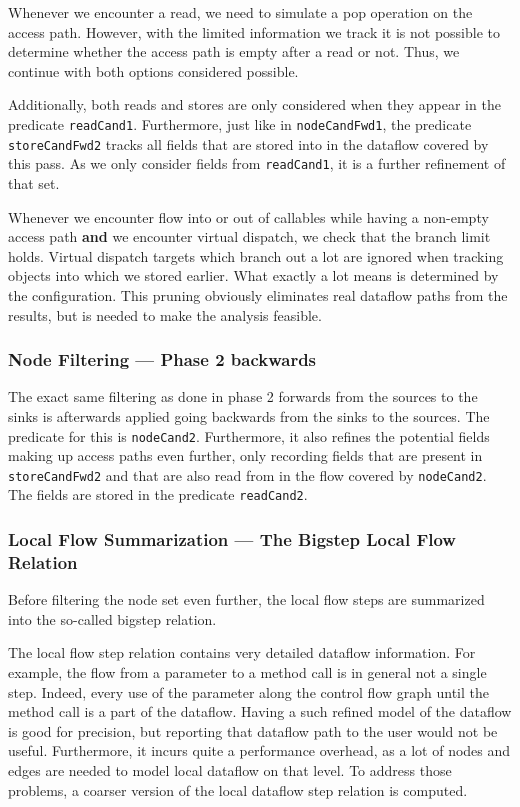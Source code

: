 Whenever we encounter a read, we need to simulate a pop operation on the access path.
However, with the limited information we track it is not possible to determine 
whether the access path is empty after a read or not.
Thus, we continue with both options considered possible.

Additionally, both reads and stores are only considered when they appear in the 
predicate \texttt{readCand1}.
Furthermore, just like in \texttt{nodeCandFwd1}, the predicate 
\texttt{storeCandFwd2} tracks all fields that are stored into in the dataflow
covered by this pass.
As we only consider fields from \texttt{readCand1}, it is a further refinement 
of that set.

Whenever we encounter flow into or out of callables while having a non-empty 
access path \textbf{and} we encounter virtual dispatch,
we check that the branch limit holds.
Virtual dispatch targets which branch out a lot are ignored when tracking objects 
into which we stored earlier. What exactly a lot means is determined by the 
configuration.
This pruning obviously eliminates real dataflow paths from the results, but is needed
to make the analysis feasible.

\subsubsection*{Node Filtering --- Phase 2 backwards}
The exact same filtering as done in phase 2 forwards from the sources to the sinks 
is afterwards applied going backwards from the sinks to the sources.
The predicate for this is \texttt{nodeCand2}.
Furthermore, it also refines the potential fields making up access paths even further,
only recording fields that are present in \texttt{storeCandFwd2} and that are 
also read from in the flow covered by \texttt{nodeCand2}.
The fields are stored in the predicate \texttt{readCand2}.


\subsubsection*{Local Flow Summarization --- The Bigstep Local Flow Relation}
Before filtering the node set even further, the local flow steps are summarized 
into the so-called bigstep relation.

The local flow step relation contains very detailed dataflow information.
For example, the flow from a parameter to a method call 
is in general not a single step.
Indeed, every use of the parameter along the control flow graph until the method 
call is a part of the dataflow.
Having a such refined model of the dataflow is good for precision, but 
reporting that dataflow path to the user would not be useful.
Furthermore, it incurs quite a performance overhead, as a lot of nodes and edges 
are needed to model local dataflow on that level.
To address those problems, a coarser version of the 
local dataflow step relation is computed.

